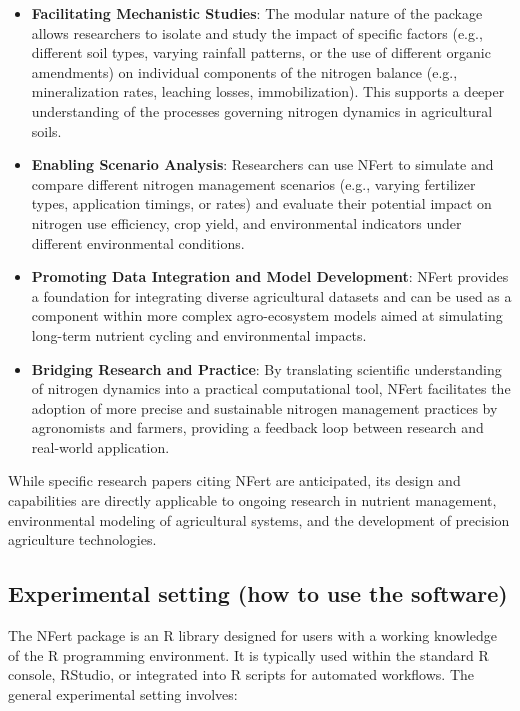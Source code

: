 \documentclass[
  11pt,
]{article}
\begin{document}
\begin{itemize}
\item
  \textbf{Facilitating Mechanistic Studies}: The modular nature of the
  package allows researchers to isolate and study the impact of specific
  factors (e.g., different soil types, varying rainfall patterns, or the
  use of different organic amendments) on individual components of the
  nitrogen balance (e.g., mineralization rates, leaching losses,
  immobilization). This supports a deeper understanding of the processes
  governing nitrogen dynamics in agricultural soils.
\item
  \textbf{Enabling Scenario Analysis}: Researchers can use NFert to
  simulate and compare different nitrogen management scenarios (e.g.,
  varying fertilizer types, application timings, or rates) and evaluate
  their potential impact on nitrogen use efficiency, crop yield, and
  environmental indicators under different environmental conditions.
\item
  \textbf{Promoting Data Integration and Model Development}: NFert
  provides a foundation for integrating diverse agricultural datasets
  and can be used as a component within more complex agro-ecosystem
  models aimed at simulating long-term nutrient cycling and
  environmental impacts.
\item
  \textbf{Bridging Research and Practice}: By translating scientific
  understanding of nitrogen dynamics into a practical computational
  tool, NFert facilitates the adoption of more precise and sustainable
  nitrogen management practices by agronomists and farmers, providing a
  feedback loop between research and real-world application.
\end{itemize}

While specific research papers citing NFert are anticipated, its design
and capabilities are directly applicable to ongoing research in nutrient
management, environmental modeling of agricultural systems, and the
development of precision agriculture technologies.

\subsection{Experimental setting (how to use the
software)}\label{experimental-setting-how-to-use-the-software}

The NFert package is an R library designed for users with a working
knowledge of the R programming environment. It is typically used within
the standard R console, RStudio, or integrated into R scripts for
automated workflows. The general experimental setting involves:
\end{document}
